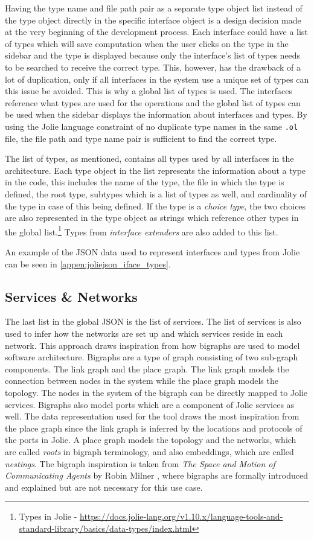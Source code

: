 Having the type name and file path pair as a separate type object list instead of the type object directly in the specific interface object is a design decision made at the very beginning of the development process.
Each interface could have a list of types which will save computation when the user clicks on the type in the sidebar and the type is displayed because only the interface's list of types needs to be searched to receive the correct type.
This, however, has the drawback of a lot of duplication, only if all interfaces in the system use a unique set of types can this issue be avoided.
This is why a global list of types is used. The interfaces reference what types are used for the operations and the global list of types can be used when the sidebar displays the information about interfaces and types.
By using the Jolie language constraint of no duplicate type names in the same \texttt{.ol} file, the file path and type name pair is sufficient to find the correct type.

The list of types, as mentioned, contains all types used by all interfaces in the architecture.
Each type object in the list represents the information about a type in the code, this includes the name of the type, the file in which the type is defined, the root type, subtypes which is a list of types as well, and cardinality of the type in case of this being defined.
If the type is a \emph{choice type}, the two choices are also represented in the type object as strings which reference other types in the global list.\footnote{Types in Jolie - \url{https://docs.jolie-lang.org/v1.10.x/language-tools-and-standard-library/basics/data-types/index.html}}
Types from \emph{interface extenders} are also added to this list.

An example of the JSON data used to represent interfaces and types from Jolie can be seen in \cref{appen:joliejson_iface_types}.

\subsection{Services \& Networks}
The last list in the global JSON is the list of services. The list of services is also used to infer how the networks are set up and which services reside in each network.
This approach draws inspiration from how bigraphs are used to model software architecture. Bigraphs are a type of graph consisting of two sub-graph components. The link graph and the place graph. The link graph models the connection between nodes in the system while the place graph models the topology.
The nodes in the system of the bigraph can be directly mapped to Jolie services. Bigraphs also model ports which are a component of Jolie services as well.
The data representation used for the tool draws the most inspiration from the place graph since the link graph is inferred by the locations and protocols of the ports in Jolie.
A place graph models the topology and the networks, which are called \emph{roots} in bigraph terminology, and also embeddings, which are called \emph{nestings}.
The bigraph inspiration is taken from \emph{The Space and Motion of Communicating Agents} by Robin Milner \cite{BigraphBook}, where bigraphs are formally introduced and explained but are not necessary for this use case.

